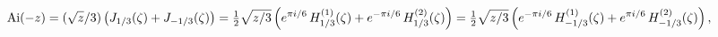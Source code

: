 \[\mathop{\mathrm{Ai}\/}\nolimits\!\left(-z\right)=(\sqrt{z}/3)\left(\mathop{J_{%
1/3}\/}\nolimits\!\left(\zeta\right)+\mathop{J_{-1/3}\/}\nolimits\!\left(\zeta%
\right)\right)=\tfrac{1}{2}\sqrt{z/3}\left(e^{\pi i/6}\mathop{{H^{(1)}_{1/3}}%
\/}\nolimits\!\left(\zeta\right)+e^{-\pi i/6}\mathop{{H^{(2)}_{1/3}}\/}%
\nolimits\!\left(\zeta\right)\right)=\tfrac{1}{2}\sqrt{z/3}\left(e^{-\pi i/6}%
\mathop{{H^{(1)}_{-1/3}}\/}\nolimits\!\left(\zeta\right)+e^{\pi i/6}\mathop{{H%
^{(2)}_{-1/3}}\/}\nolimits\!\left(\zeta\right)\right),\]